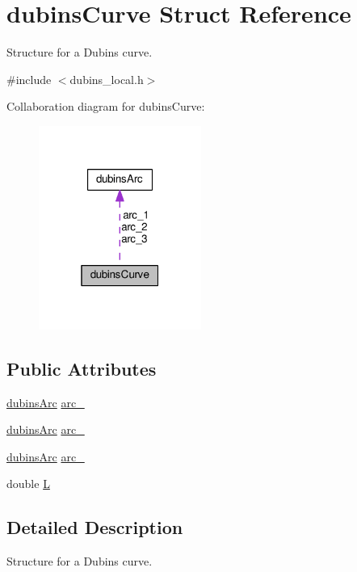 \hypertarget{structdubinsCurve}{}\section{dubins\+Curve Struct Reference}
\label{structdubinsCurve}


Structure for a Dubins curve.  




{\ttfamily \#include $<$dubins\+\_\+local.\+h$>$}



Collaboration diagram for dubins\+Curve\+:\nopagebreak
\begin{figure}[H]
\begin{center}
\leavevmode
\includegraphics[width=151pt]{structdubinsCurve__coll__graph}
\end{center}
\end{figure}
\subsection*{Public Attributes}
\begin{DoxyCompactItemize}
\item 
\hyperlink{structdubinsArc}{dubins\+Arc} \hyperlink{structdubinsCurve_a0a21df61b2cb1cdd397bdc54b5aa7d7a}{arc\+\_}
\item 
\hyperlink{structdubinsArc}{dubins\+Arc} \hyperlink{structdubinsCurve_ac1cfde797f443b1a73ec3786bcc05e1e}{arc\+\_}
\item 
\hyperlink{structdubinsArc}{dubins\+Arc} \hyperlink{structdubinsCurve_a523eb4572b6595ef9a62e7abe934bca6}{arc\+\_}
\item 
double \hyperlink{structdubinsCurve_a4f52a92a56a4544b055cda0dbf7c4ad4}{L}
\end{DoxyCompactItemize}


\subsection{Detailed Description}
Structure for a Dubins curve. 

